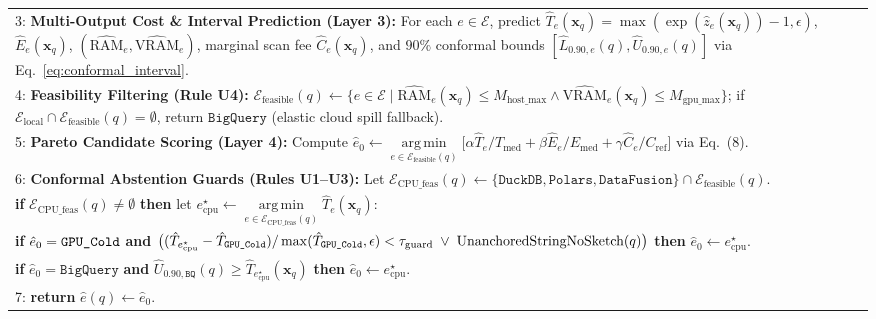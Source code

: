 \documentclass[10pt,a4paper]{article}
\newenvironment{fitasttable}{%
  \begin{lrbox}{\asttblbox}%
}{%
  \end{lrbox}%
  \sbox{\asttblboxB}{%
    \ifdim\wd\asttblbox>0.96\textwidth
      \resizebox{0.96\textwidth}{!}{\usebox{\asttblbox}}%
    \else
      \usebox{\asttblbox}%
    \fi
  }%
  \ifdim\ht\asttblboxB>0.72\textheight
    \resizebox{!}{0.72\textheight}{\usebox{\asttblboxB}}%
  \else
    \usebox{\asttblboxB}%
  \fi
}
\begin{document}
\begin{table}[!t]
\begin{fitasttable}
\begin{tabular}{@{}p{}@{}}
3: \textbf{Multi-Output Cost \& Interval Prediction (Layer 3):} For each $e \in \mathcal{E}$, predict $\hat{T}_e(\mathbf{x}_q) = \max(\exp(\hat{z}_e(\mathbf{x}_q))-1,\epsilon)$, $\hat{E}_e(\mathbf{x}_q)$, $(\widehat{\text{RAM}}_e, \widehat{\text{VRAM}}_e)$, marginal scan fee $\hat{C}_e(\mathbf{x}_q)$, and $90\%$ conformal bounds $[\hat{L}_{0.90,e}(q), \hat{U}_{0.90,e}(q)]$ via Eq.~\eqref{eq:conformal_interval}. \\
4: \textbf{Feasibility Filtering (Rule U4):} $\mathcal{E}_{\text{feasible}}(q) \leftarrow \{e \in \mathcal{E} \mid \widehat{\text{RAM}}_e(\mathbf{x}_q) \le M_{\text{host\_max}} \wedge \widehat{\text{VRAM}}_e(\mathbf{x}_q) \le M_{\text{gpu\_max}}\}$; if $\mathcal{E}_{\text{local}} \cap \mathcal{E}_{\text{feasible}}(q) = \emptyset$, return $\texttt{BigQuery}$ (elastic cloud spill fallback). \\
5: \textbf{Pareto Candidate Scoring (Layer 4):} Compute $\hat{e}_0 \leftarrow \operatorname*{arg\,min}\limits_{e \in \mathcal{E}_{\text{feasible}}(q)} \big[\alpha \hat{T}_e/T_{\text{med}} + \beta \hat{E}_e/E_{\text{med}} + \gamma \hat{C}_e/C_{\text{ref}}\big]$ via Eq.~(8). \\
6: \textbf{Conformal Abstention Guards (Rules U1--U3):} Let $\mathcal{E}_{\text{CPU\_feas}}(q) \leftarrow \{\texttt{DuckDB},\texttt{Polars},\texttt{DataFusion}\}\cap\mathcal{E}_{\text{feasible}}(q)$. \\
\hspace*{1.2em}\textbf{if} $\mathcal{E}_{\text{CPU\_feas}}(q) \neq \emptyset$ \textbf{then} let $e_{\text{cpu}}^\star \leftarrow \operatorname*{arg\,min}\limits_{e \in \mathcal{E}_{\text{CPU\_feas}}(q)} \hat{T}_e(\mathbf{x}_q)$: \\
\hspace*{2.4em}\textbf{if} $\hat{e}_0 = \texttt{GPU\_\allowbreak{}Cold}$ \textbf{and} $\big((\hat{T}_{e_{\text{cpu}}^\star} - \hat{T}_{\texttt{GPU\_\allowbreak{}Cold}})/\max(\hat{T}_{\texttt{GPU\_\allowbreak{}Cold}},\epsilon) < \tau_{\text{guard}} \;\vee\; \text{UnanchoredStringNoSketch}(q)\big)$ \textbf{then} $\hat{e}_0 \leftarrow e_{\text{cpu}}^\star$. \\
\hspace*{2.4em}\textbf{if} $\hat{e}_0 = \texttt{BigQuery}$ \textbf{and} $\hat{U}_{0.90,\texttt{BQ}}(q) \ge \hat{T}_{e_{\text{cpu}}^\star}(\mathbf{x}_q)$ \textbf{then} $\hat{e}_0 \leftarrow e_{\text{cpu}}^\star$. \\
7: \textbf{return} $\hat{e}(q) \leftarrow \hat{e}_0$. \\
\bottomrule
\end{tabular}
\end{fitasttable}
\end{table}
\end{document}
